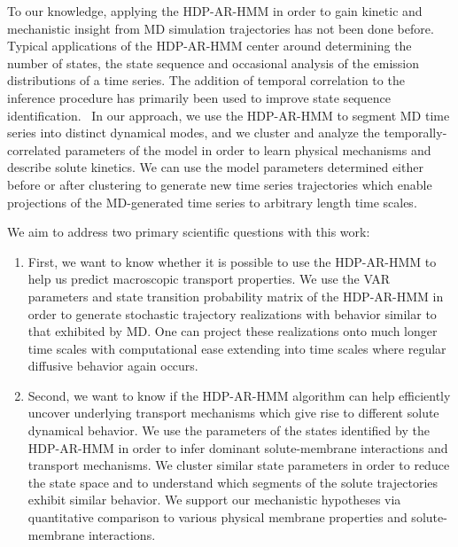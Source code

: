 \documentclass[journal=jpcbfk,manuscript=article]{achemso}
\begin{document}
  To our knowledge, applying the HDP-AR-HMM in order to gain kinetic and
  mechanistic insight from MD simulation trajectories has not been done
  before.
  Typical applications of the HDP-AR-HMM center around determining the 
  number of states, the state sequence and occasional analysis of the emission 
  distributions of a time series. The addition of temporal correlation to 
  the inference procedure has primarily been used to improve state sequence 
  identification.~\cite{calderon_inferring_2015,hamada_modeling_2016}
  In our approach, we use the HDP-AR-HMM to segment MD time series into distinct
  dynamical modes, and we cluster and analyze the temporally-correlated 
  parameters of the model in order to learn physical mechanisms and describe
  solute kinetics. We can use the model parameters determined either before 
  or after clustering to generate new 
  time series trajectories which enable projections 
  of the MD-generated time series to arbitrary length time scales.
  
  We aim to address two primary scientific questions with this work:
  \begin{enumerate}
  \item First, we want to know whether it is possible to use the HDP-AR-HMM to 
  help us predict macroscopic transport properties. We use the VAR parameters
  and state transition probability matrix of the HDP-AR-HMM in order to 
  generate stochastic trajectory realizations with behavior similar to that
  exhibited by MD. One can project these realizations onto much longer 
  time scales with computational ease extending into time scales where 
  regular diffusive behavior again occurs.
  \item Second, we want to know if the HDP-AR-HMM algorithm can help
  efficiently uncover underlying transport mechanisms which give rise to different 
  solute dynamical behavior.
  We use the parameters of the states identified by the HDP-AR-HMM in order to infer 
  dominant solute-membrane interactions and transport mechanisms. We cluster similar 
  state parameters in order to reduce the state space and to understand which segments 
  of the solute trajectories exhibit similar behavior. We support our mechanistic 
  hypotheses via quantitative comparison to various physical membrane properties and
  solute-membrane interactions.
  \end{enumerate}
\end{document}
